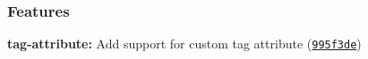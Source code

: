\subsubsection*{Features}


\begin{DoxyItemize}
\item {\bfseries tag-\/attribute\+:} Add support for custom tag attribute (\href{https://github.com/webpack/style-loader/commit/995f3de}{\tt 995f3de}) 
\end{DoxyItemize}